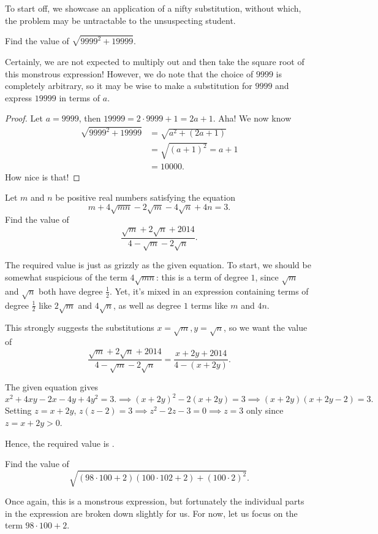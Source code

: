 \documentclass[../jarvis.tex]{subfiles}
\begin{document}
To start off, we showcase an application of a nifty substitution, without which, the problem may be untractable to the unsuspecting student.
\begin{example}[2013 SMO(J) P11]
    Find the value of $\sqrt{9999^2+19999}.$
\end{example}
Certainly, we are not expected to multiply out and then take the square root of this monstrous expression! However, we do note that the choice of $9999$ is completely arbitrary, so it may be wise to make a substitution for $9999$ and express $19999$ in terms of $a$.

\begin{proof}
    Let $a=9999$, then $19999=2\cdot 9999+1=2a+1$. Aha! We now know
\begin{align*}
    \sqrt{9999^2+19999}&=\sqrt{a^2+(2a+1)} \\
    &=\sqrt{(a+1)^2}=a+1 \\
    &=\boxed{10000}.
\end{align*}
How nice is that!
\end{proof}

\begin{example}[2014 SMO(J) P16]
    Let $m$ and $n$ be positive real numbers satisfying the equation
    $$m+4\sqrt{mn}-2\sqrt{m}-4\sqrt{n}+4n=3.$$
    Find the value of $$\frac{\sqrt{m}+2\sqrt{n}+2014}{4-\sqrt{m}-2\sqrt{n}}.$$
\end{example}
The required value is just as grizzly as the given equation. To start, we should be somewhat suspicious of the term $4\sqrt{mn}$: this is a term of degree $1$, since $\sqrt{m}$ and $\sqrt{n}$ both have degree $\frac{1}{2}$. Yet, it's mixed in an expression containing terms of degree $\frac{1}{2}$ like $2\sqrt{m}$ and $4\sqrt{n}$, as well as degree $1$ terms like $m$ and $4n$.

This strongly suggests the substitutions $x=\sqrt{m}, y=\sqrt{n}$, so we want the value of 
$$\frac{\sqrt{m}+2\sqrt{n}+2014}{4-\sqrt{m}-2\sqrt{n}}=\frac{x+2y+2014}{4-(x+2y)}.$$

The given equation gives $$x^2+4xy-2x-4y+4y^2=3. \implies (x+2y)^2-2(x+2y)=3 \implies (x+2y)(x+2y-2)=3.$$ Setting $z=x+2y$, $z(z-2)=3 \implies z^2-2z-3=0 \implies z=3$ only since $z=x+2y>0$. 

Hence, the required value is .

\begin{example}[2015 SMO(J) P21]
    Find the value of $$\sqrt{(98\cdot 100+2)(100\cdot 102+2)+(100\cdot 2)^2}.$$
\end{example}
Once again, this is a monstrous expression, but fortunately the individual parts in the expression are broken down slightly for us. For now, let us focus on the term $98\cdot 100+2$. 
\end{document}
